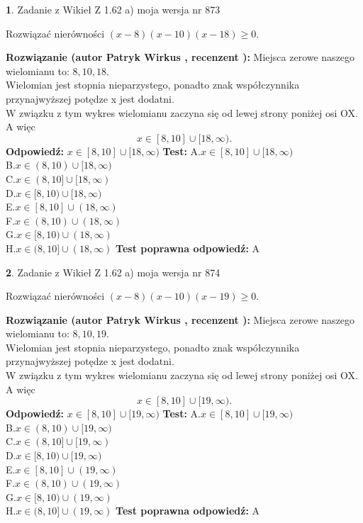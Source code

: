 \documentclass[12pt, a4paper]{article}
\theoremstyle{definition} %
\newtheorem{zad}{}
\newcommand{\zadStart}[1]{\begin{zad}#1\newline}
\newcommand{\zadStop}{\end{zad}}
\newcommand{\rozwStart}[2]{\noindent \textbf{Rozwiązanie (autor #1 , recenzent #2): }\newline}
\newcommand{\rozwStop}{\newline}
\newcommand{\odpStart}{\noindent \textbf{Odpowiedź:}\newline}
\newcommand{\odpStop}{\newline}
\newcommand{\testStart}{\noindent \textbf{Test:}\newline}
\newcommand{\testStop}{\newline}
\newcommand{\kluczStart}{\noindent \textbf{Test poprawna odpowiedź:}\newline}
\newcommand{\kluczStop}{\newline}
\begin{document}
\zadStart{Zadanie z Wikieł Z 1.62 a) moja wersja nr 873}

Rozwiązać nierówności $(x-8)(x-10)(x-18)\ge0$.
\zadStop
\rozwStart{Patryk Wirkus}{}
Miejsca zerowe naszego wielomianu to: $8, 10, 18$.\\
Wielomian jest stopnia nieparzystego, ponadto znak współczynnika przy\linebreak najwyższej potędze x jest dodatni.\\ W związku z tym wykres wielomianu zaczyna się od lewej strony poniżej osi OX. A więc $$x \in [8,10] \cup [18,\infty).$$
\rozwStop
\odpStart
$x \in [8,10] \cup [18,\infty)$
\odpStop
\testStart
A.$x \in [8,10] \cup [18,\infty)$\\
B.$x \in (8,10) \cup [18,\infty)$\\
C.$x \in (8,10] \cup [18,\infty)$\\
D.$x \in [8,10) \cup [18,\infty)$\\
E.$x \in [8,10] \cup (18,\infty)$\\
F.$x \in (8,10) \cup (18,\infty)$\\
G.$x \in [8,10) \cup (18,\infty)$\\
H.$x \in (8,10] \cup (18,\infty)$
\testStop
\kluczStart
A
\kluczStop



\zadStart{Zadanie z Wikieł Z 1.62 a) moja wersja nr 874}

Rozwiązać nierówności $(x-8)(x-10)(x-19)\ge0$.
\zadStop
\rozwStart{Patryk Wirkus}{}
Miejsca zerowe naszego wielomianu to: $8, 10, 19$.\\
Wielomian jest stopnia nieparzystego, ponadto znak współczynnika przy\linebreak najwyższej potędze x jest dodatni.\\ W związku z tym wykres wielomianu zaczyna się od lewej strony poniżej osi OX. A więc $$x \in [8,10] \cup [19,\infty).$$
\rozwStop
\odpStart
$x \in [8,10] \cup [19,\infty)$
\odpStop
\testStart
A.$x \in [8,10] \cup [19,\infty)$\\
B.$x \in (8,10) \cup [19,\infty)$\\
C.$x \in (8,10] \cup [19,\infty)$\\
D.$x \in [8,10) \cup [19,\infty)$\\
E.$x \in [8,10] \cup (19,\infty)$\\
F.$x \in (8,10) \cup (19,\infty)$\\
G.$x \in [8,10) \cup (19,\infty)$\\
H.$x \in (8,10] \cup (19,\infty)$
\testStop
\kluczStart
A
\kluczStop
\end{document}
